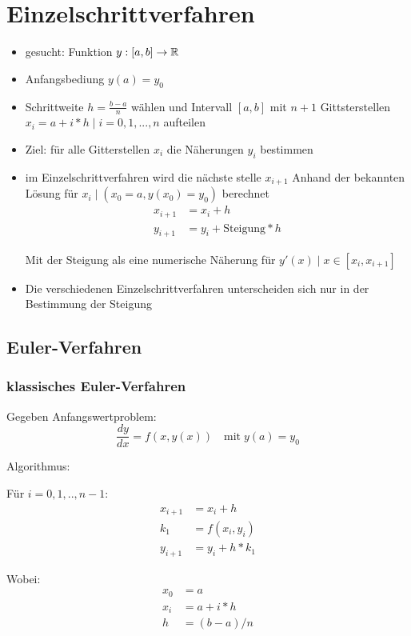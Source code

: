 \section{Einzelschrittverfahren}

\begin{itemize}
	\item gesucht: Funktion $y : [a, b] \to \mathbb{R}$
	\item Anfangsbediung $y(a) = y_0$
	\item Schrittweite $h = \frac{b-a}{n}$ wählen und Intervall $[a,b]$
	      mit $n+1$ Gittsterstellen $x_i = a + i*h \; | \; i = 0,1,...,n$
	      aufteilen
	\item Ziel: für alle Gitterstellen $x_i$ die Näherungen $y_i$ bestimmen
	\item im Einzelschrittverfahren wird die nächste stelle $x_{i+1}$ Anhand
	      der bekannten Lösung für $x_i \; | \; (x_0 = a, y(x_0) = y_0)$ berechnet
	      \begin{align*}
		      x_{i+1} & = x_i + h                     \\
		      y_{i+1} & = y_i + \mathrm{Steigung} * h
	      \end{align*}

	      Mit der Steigung als eine numerische Näherung für
	      $y'(x) \; | \; x \in [x_i, x_{i+1}]$
	\item Die verschiedenen Einzelschrittverfahren unterscheiden sich nur
	      in der Bestimmung der Steigung
\end{itemize}



\subsection{Euler-Verfahren}


\subsubsection{klassisches Euler-Verfahren}

Gegeben Anfangswertproblem:
$$\frac{dy}{dx} = f(x, y(x)) \quad \mathrm{mit} \; y(a) = y_0$$


\begingroup
\addtolength{\jot}{0.5em}
\large

Algorithmus:

\begin{multicols}{2}
	Für $i = 0,1,..,n-1$:
	\begin{align*}
		x_{i+1} & = x_i + h       \\
		k_1     & = f(x_i, y_i)   \\
		y_{i+1} & = y_i + h * k_1
	\end{align*}

	\columnbreak

	Wobei:
	\begin{align*}
		x_0 & = a       \\
		x_i & = a + i*h \\
		h   & = (b-a)/n
	\end{align*}
	\vspace{\fill}
\end{multicols}
\endgroup


